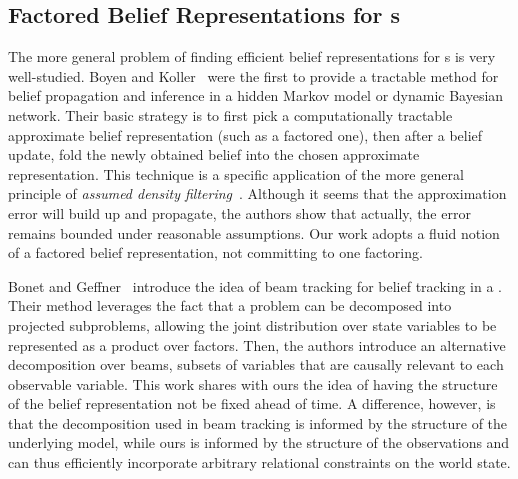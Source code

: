 \subsection{Factored Belief Representations for \pomdp s}
The more general problem of finding efficient belief representations
for \pomdp s is very well-studied. Boyen and Koller~\cite{boyenkoller}
were the first to provide a tractable method for belief propagation
and inference in a hidden Markov model or dynamic Bayesian
network. Their basic strategy is to first pick a computationally
tractable approximate belief representation (such as a factored one),
then after a belief update, fold the newly obtained belief into the
chosen approximate representation. This technique is a specific
application of the more general principle of \emph{assumed density
  filtering}~\cite{maybeck1982stochastic}. Although it seems that the
approximation error will build up and propagate, the authors show that
actually, the error remains bounded under reasonable assumptions. Our
work adopts a fluid notion of a factored belief representation, not
committing to one factoring.

Bonet and Geffner~\cite{bonet2014belief} introduce the idea of beam tracking for belief
tracking in a \pomdp. Their method leverages the fact that a problem
can be decomposed into projected subproblems, allowing the joint
distribution over state variables to be represented as a product over
factors. Then, the authors introduce an alternative decomposition over
beams, subsets of variables that are causally relevant to each
observable variable. This work shares with ours the idea of having the
structure of the belief representation not be fixed ahead of time. A
difference, however, is that the decomposition used in beam tracking
is informed by the structure of the underlying model, while ours is
informed by the structure of the observations and can thus efficiently
incorporate arbitrary relational constraints on the world state.


